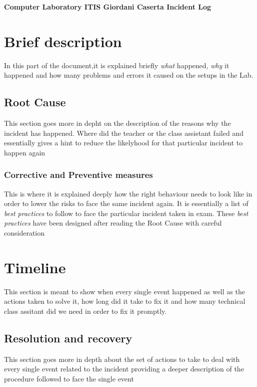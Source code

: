 \documentclass[a4paper,12pt]{article}
\begin{document}
\textbf{Computer Laboratory ITIS Giordani Caserta Incident Log}


\tableofcontents
\clearpage

\Large
\section{Brief description}
\normalsize
In this part of the document,it is explained briefly \emph{what}  happened, \emph{why} it happened and how many problems and errors it caused on the setups in the Lab.

\Large
\subsection{Root Cause}
\normalsize
This section goes more in depht on the description of the reasons why the incident has happened. Where did the teacher or the class assistant failed and essentially gives a hint to reduce the likelyhood for that particular incident to happen again

\Large
\subsubsection{Corrective and Preventive measures}
\normalsize
This is where it is explained deeply how the right behaviour needs to look like in order to lower the risks to face the same incident again. It is essentially a list of \emph{best practices} to follow to face the particular incident taken in exam. These \emph{best practices} have been designed after reading the Root Cause with careful consideration

\Large
\section{Timeline}
\normalsize
This section is meant to show when every single event happened as well as the actions taken to solve it, how long did it take to fix it and how many technical class assitant did we need in order to fix it promptly.

\Large
\subsection{Resolution and recovery}
\normalsize
This section goes more in depth about the set of actions to take to deal with every single event related to the incident providing a deeper description of the procedure followed to face the single event
\clearpage
\end{document}
